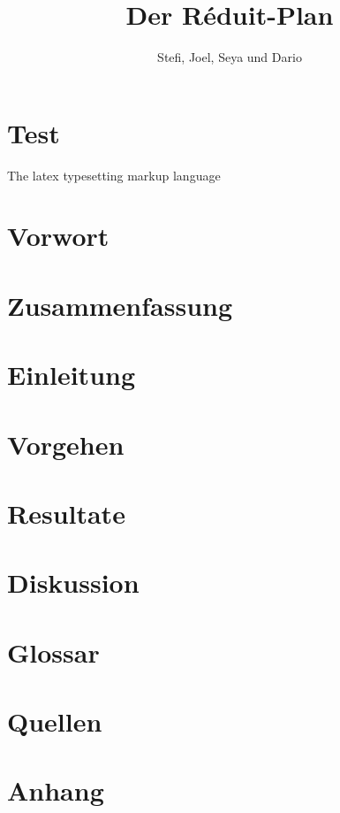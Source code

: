 \documentclass[opensans]{article}
\title{Der Réduit-Plan}
\author{Stefi, Joel, Seya und Dario}
\begin{document}
\begin{titlepage}
    \maketitle
\end{titlepage}

\tableofcontents

\newpage

\section{Test}
The \gls{latex} typesetting markup language

\section{Vorwort} \label{Vorwort}

\newpage 

\section{Zusammenfassung} \label{Zusammenfassung}

\newpage

\section{Einleitung} \label{Einleitung}

\newpage

\section{Vorgehen} \label{Vorgehen}

\newpage

\section{Resultate} \label{Resultate}

\newpage

\section{Diskussion} \label{Diskussion}

\newpage

\section{Glossar} \label{Glossar}
\printglossaries
\newpage

\section{Quellen} \label{Quellen}
\printbibliography
\newpage

\section{Anhang} \label{Anhang}

 
\end{document}
